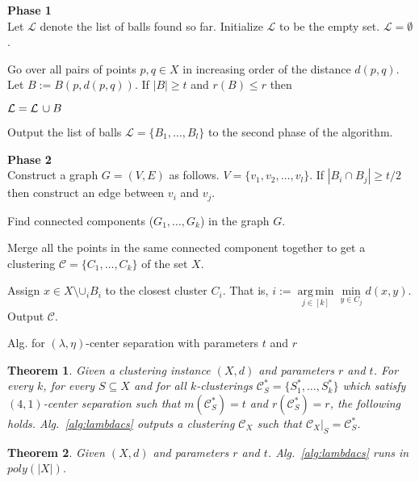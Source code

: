 \documentclass[12pt]{article}
\newtheorem{theorem}{Theorem}
\newcommand{\mc}{\mathcal}
\DeclareMathOperator*{\argmin}{arg\,min}
\begin{document}
\begin{algorithm}[!ht]	
	\Indp{}
	\KwOut{A clustering $\mc C$ of the set $X$.}
	
	\vspace{0.1in}\textbf{Phase 1}\\
	Let $\mc L$ denote the list of balls found so far. Initialize $\mc L$ to be the empty set. $\mc L = \emptyset$.
	
	Go over all pairs of points $p, q \in X$ in increasing order of the distance $d(p, q)$. Let $B := B(p, d(p, q))$. If $|B| \ge t$ and $r(B) \le r$ then
	
	\hspace{0.24in}$\mc L = \mc L \thinspace\cup B$
	
	\vspace{0.1in}Output the list of balls $\mc L = \{B_1, \ldots, B_l\}$ to the second phase of the algorithm.
	
	\vspace{0.1in}\textbf{Phase 2}\\
	Construct a graph $G = (V, E)$ as follows. $V = \{v_1, v_2, \ldots, v_l\}$. If $|B_i \cap B_j| \ge t/2$ then construct an edge between $v_i$ and $v_j$.
	
	Find connected components ($G_1, \ldots, G_{k}$) in the graph $G$. 
	
	Merge all the points in the same connected component together to get a clustering $\mc C = \{C_1, \ldots, C_k\}$ of the set $X$.
	
	Assign $x \in X \setminus \mc \cup_i B_i$ to the closest cluster $C_i$. That is, $i := \argmin\limits_{j\in [k]} \min\limits_{y \in C_j}d(x, y)$. Output $\mc C$. 
\caption{Alg. for $(\lambda, \eta)$-center separation with parameters $t$ and $r$}
\label{alg:lambdacs}
\end{algorithm}
\vspace{-.1in}
\begin{theorem}
\label{thm:lambdacsnoise}
Given a clustering instance $(X, d)$ and parameters $r$ and $t$. For every $k$, for every $S \subseteq X$ and for all $k$-clusterings $\mc C^*_{S} = \{S_1^*, \ldots, S_k^*\}$ which satisfy $(4, 1)$-center separation such that $ m(\mc C_{S}^*) = t$ and $r(\mc C_{S}^*) = r$, the following holds. Alg.~\ref{alg:lambdacs} outputs a clustering $\mc C_{X}$ such that $\mc C_{X}|_{S} = \mc C_{S}^*$.
\end{theorem}

\begin{theorem}
\label{thm:alglambdacstime}
Given $(X, d)$ and parameters $r$ and $t$. Alg.~\ref{alg:lambdacs} runs in $poly(|X|)$.
\end{theorem}
\end{document}
